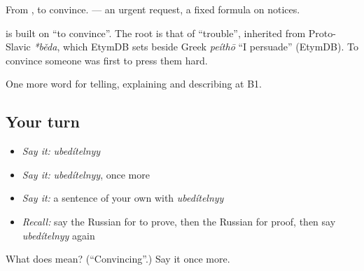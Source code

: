 From \emph{}, to convince. \emph{ } — an urgent request, a fixed formula on notices.

\begin{cousinweb}
\textbf{} is built on \emph{} \textquotedblleft{}to convince\textquotedblright{}. The root is that of \emph{} \textquotedblleft{}trouble\textquotedblright{}, inherited from Proto-Slavic \emph{*běda}, which EtymDB sets beside Greek \emph{peíthō} \textquotedblleft{}I persuade\textquotedblright{} (EtymDB). To convince someone was first to press them hard.
\end{cousinweb}

\begin{grammarlens}[title={What you've built}]
One more word for telling, explaining and describing at B1.
\end{grammarlens}

\subsection*{Your turn}
\begin{itemize}
\raggedright
  \item \emph{Say it:} \emph{ubedítelnyy}
  \item \emph{Say it:} \emph{ubedítelnyy}, once more
  \item \emph{Say it:} a sentence of your own with \emph{ubedítelnyy}
  \item \emph{Recall:} say the Russian for to prove, then the Russian for proof, then say \emph{ubedítelnyy} again
\end{itemize}

\begin{tcolorbox}[breakable,colback=teal!4,colframe=teal!35!black,title={Before you move on}]
What does  mean? (\textquotedblleft{}Convincing\textquotedblright{}.) Say it once more.
\end{tcolorbox}
